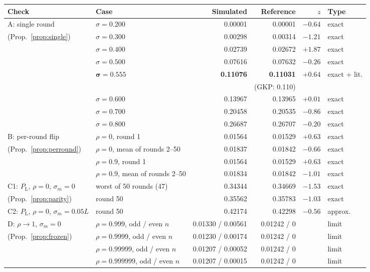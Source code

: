 \documentclass[11pt,letterpaper]{article}
\newcommand{\PL}{P_{\mathrm{L}}}
\begin{document}
{\footnotesize
\setlength{\tabcolsep}{4pt}
\begin{longtable}{@{}p{3.5cm}p{4.3cm}rrrl@{}}
\toprule
Check & Case & Simulated & Reference & $z$ & Type \\
\midrule
\endhead
A: single round & $\sigma=0.200$ & 0.00001 & 0.00001 & $-0.64$ & exact \\
(Prop.~\ref{prop:single}) & $\sigma=0.300$ & 0.00298 & 0.00314 & $-1.21$ & exact \\
 & $\sigma=0.400$ & 0.02739 & 0.02672 & $+1.87$ & exact \\
 & $\sigma=0.500$ & 0.07616 & 0.07632 & $-0.26$ & exact \\
 & $\boldsymbol{\sigma=0.555}$ & \textbf{0.11076} & \textbf{0.11031} & $+0.64$ & exact + lit. \\
 & & & (GKP: 0.110) & & \\
 & $\sigma=0.600$ & 0.13967 & 0.13965 & $+0.01$ & exact \\
 & $\sigma=0.700$ & 0.20458 & 0.20535 & $-0.86$ & exact \\
 & $\sigma=0.800$ & 0.26687 & 0.26707 & $-0.20$ & exact \\
\midrule
B: per-round flip & $\rho=0$, round 1 & 0.01564 & 0.01529 & $+0.63$ & exact \\
(Prop.~\ref{prop:perround}) & $\rho=0$, mean of rounds 2--50 & 0.01837 & 0.01842 & $-0.66$ & exact \\
 & $\rho=0.9$, round 1 & 0.01564 & 0.01529 & $+0.63$ & exact \\
 & $\rho=0.9$, mean of rounds 2--50 & 0.01834 & 0.01842 & $-1.01$ & exact \\
\midrule
C1: $\PL$, $\rho=0$, $\sigma_m=0$ & worst of 50 rounds (47) & 0.34344 & 0.34669 & $-1.53$ & exact \\
(Prop.~\ref{prop:parity}) & round 50 & 0.35562 & 0.35783 & $-1.03$ & exact \\
\midrule
C2: $\PL$, $\rho=0$, $\sigma_m=0.05L$ & round 50 & 0.42174 & 0.42298 & $-0.56$ & approx. \\
\midrule
D: $\rho\to1$, $\sigma_m=0$ & $\rho=0.999$, odd / even $n$ & 0.01330 / 0.00561 & 0.01242 / 0 & & limit \\
(Prop.~\ref{prop:frozen}) & $\rho=0.9999$, odd / even $n$ & 0.01230 / 0.00174 & 0.01242 / 0 & & limit \\
 & $\rho=0.99999$, odd / even $n$ & 0.01207 / 0.00052 & 0.01242 / 0 & & limit \\
 & $\rho=0.999999$, odd / even $n$ & 0.01207 / 0.00015 & 0.01242 / 0 & & limit \\
\bottomrule
\end{longtable}
}
\end{document}
